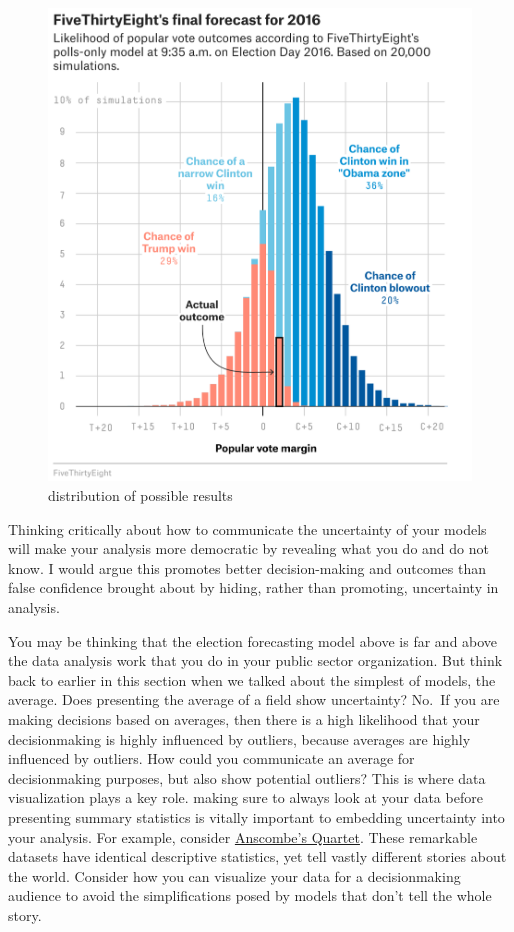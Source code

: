 \documentclass[
]{book}
\begin{document}
\begin{figure}
\centering
\includegraphics{images/uncertain_dist.png}
\caption{distribution of possible results}
\end{figure}

Thinking critically about how to communicate the uncertainty of your models will make your analysis more democratic by revealing what you do and do not know. I would argue this promotes better decision-making and outcomes than false confidence brought about by hiding, rather than promoting, uncertainty in analysis.

You may be thinking that the election forecasting model above is far and above the data analysis work that you do in your public sector organization. But think back to earlier in this section when we talked about the simplest of models, the average. Does presenting the average of a field show uncertainty? No.~If you are making decisions based on averages, then there is a high likelihood that your decisionmaking is highly influenced by outliers, because averages are highly influenced by outliers. How could you communicate an average for decisionmaking purposes, but also show potential outliers? This is where data visualization plays a key role. making sure to always look at your data before presenting summary statistics is vitally important to embedding uncertainty into your analysis. For example, consider \href{https://en.wikipedia.org/wiki/Anscombe's_quartet}{Anscombe's Quartet}. These remarkable datasets have identical descriptive statistics, yet tell vastly different stories about the world. Consider how you can visualize your data for a decisionmaking audience to avoid the simplifications posed by models that don't tell the whole story.
\end{document}
